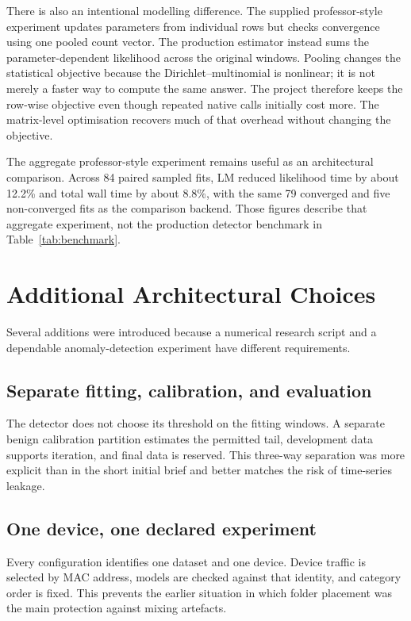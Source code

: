 \documentclass[11pt,a4paper]{article}
\begin{document}
There is also an intentional modelling difference. The supplied professor-style experiment updates parameters from individual rows but checks convergence using one pooled count vector. The production estimator instead sums the parameter-dependent likelihood across the original windows. Pooling changes the statistical objective because the Dirichlet--multinomial is nonlinear; it is not merely a faster way to compute the same answer. The project therefore keeps the row-wise objective even though repeated native calls initially cost more. The matrix-level optimisation recovers much of that overhead without changing the objective.

The aggregate professor-style experiment remains useful as an architectural comparison. Across 84 paired sampled fits, LM reduced likelihood time by about 12.2\% and total wall time by about 8.8\%, with the same 79 converged and five non-converged fits as the comparison backend. Those figures describe that aggregate experiment, not the production detector benchmark in Table~\ref{tab:benchmark}.

\section{Additional Architectural Choices}

Several additions were introduced because a numerical research script and a dependable anomaly-detection experiment have different requirements.

\subsection{Separate fitting, calibration, and evaluation}

The detector does not choose its threshold on the fitting windows. A separate benign calibration partition estimates the permitted tail, development data supports iteration, and final data is reserved. This three-way separation was more explicit than in the short initial brief and better matches the risk of time-series leakage.

\subsection{One device, one declared experiment}

Every configuration identifies one dataset and one device. Device traffic is selected by MAC address, models are checked against that identity, and category order is fixed. This prevents the earlier situation in which folder placement was the main protection against mixing artefacts.
\end{document}
